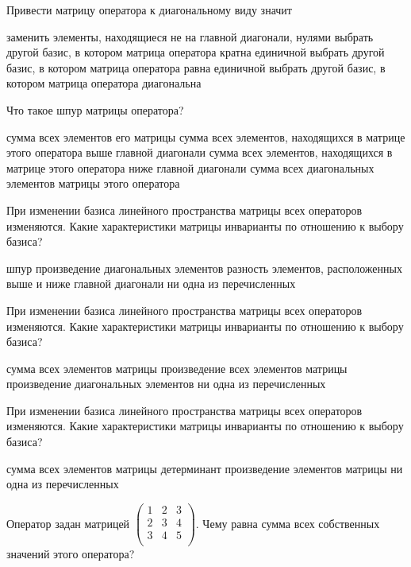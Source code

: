 \documentclass[11pt,a4paper]{exam}
\begin{document}
\begin{questions}
\question Привести матрицу оператора к диагональному виду значит
\begin{choices}
\choice заменить элементы, находящиеся не на главной диагонали, нулями
\choice выбрать другой базис, в котором матрица оператора кратна единичной
\choice выбрать другой базис, в котором матрица оператора равна единичной
\choice выбрать другой базис, в котором матрица оператора диагональна
\end{choices}

\question Что такое шпур матрицы оператора?
\begin{choices}
\choice сумма всех элементов его матрицы
\choice сумма всех элементов, находящихся в матрице этого оператора выше главной диагонали
\choice сумма всех элементов, находящихся в матрице этого оператора ниже главной диагонали
\choice сумма всех диагональных элементов матрицы этого оператора 
\end{choices}

\question При изменении базиса линейного пространства матрицы всех операторов изменяются. Какие характеристики матрицы инварианты по отношению к выбору базиса?
\begin{choices}
\choice шпур
\choice произведение диагональных элементов
\choice разность элементов, расположенных выше и ниже главной диагонали
\choice ни одна из перечисленных
\end{choices}

\question При изменении базиса линейного пространства матрицы всех операторов изменяются. Какие характеристики матрицы инварианты по отношению к выбору базиса?
\begin{choices}
\choice сумма всех элементов матрицы
\choice произведение всех элементов матрицы
\choice произведение диагональных элементов
\choice ни одна из перечисленных
\end{choices}

\question При изменении базиса линейного пространства матрицы всех операторов изменяются. Какие характеристики матрицы инварианты по отношению к выбору базиса?
\begin{choices}
\choice сумма всех элементов матрицы
\choice детерминант
\choice произведение элементов матрицы
\choice ни одна из перечисленных
\end{choices}

\question Оператор задан матрицей $\left( \begin{matrix}
   1 & 2 & 3  \\
   2 & 3 & 4  \\
   3 & 4 & 5  \\
\end{matrix} \right)$. Чему равна сумма всех собственных значений этого оператора?
\begin{choices}
\end{choices}


\end{questions}
\end{document}
